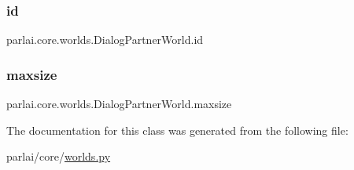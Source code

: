 \subsubsection{\texorpdfstring{id}{id}}
{\footnotesize\ttfamily parlai.\+core.\+worlds.\+Dialog\+Partner\+World.\+id}

\mbox{\label{classparlai_1_1core_1_1worlds_1_1DialogPartnerWorld_acae28d33fb7d494b7df84d0f8c57eb23}} 
\subsubsection{\texorpdfstring{maxsize}{maxsize}}
{\footnotesize\ttfamily parlai.\+core.\+worlds.\+Dialog\+Partner\+World.\+maxsize\hspace{0.3cm}{\ttfamily [static]}}



The documentation for this class was generated from the following file\+:\begin{DoxyCompactItemize}
\item 
parlai/core/\hyperlink{parlai_2core_2worlds_8py}{worlds.\+py}\end{DoxyCompactItemize}
